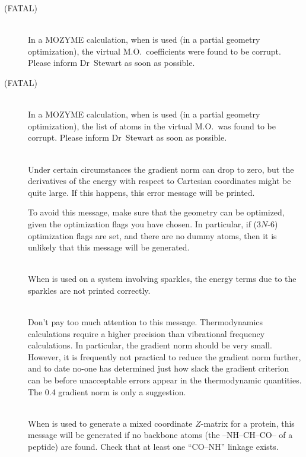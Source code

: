 \begin{description}
\item[ (FATAL)]~\\
In a MOZYME calculation, when  is used (in a partial geometry
optimization), the virtual  M.O.\ coefficients were found to be corrupt.
Please inform Dr~Stewart as soon as possible.

\item[ (FATAL)]~\\
In a MOZYME calculation, when  is used (in a partial geometry
optimization), the list of atoms in the virtual M.O.\  was found to be corrupt.
Please inform Dr~Stewart as soon as possible.

\item[]~\\
Under certain circumstances the gradient norm can drop to zero, but the
derivatives of the energy with respect to Cartesian coordinates might be
quite large.  If this happens, this error message will be printed.

To avoid this message, make sure that the geometry can be optimized, given the
optimization flags you have chosen.  In particular, if (3$N$-6) optimization
flags are set, and there are no dummy atoms, then it is unlikely that this
message will be generated. 

\item[]~\\
When  is used on a system involving sparkles, the energy terms
due to the sparkles are not printed correctly.

\item[]~\\
Don't pay too  much  attention  to  this  message.   Thermodynamics
calculations  require  a  higher  precision  than  vibrational frequency
calculations.  In particular, the gradient norm should  be  very  small.
However,  it  is  frequently  not  practical to reduce the gradient norm
further, and to date no-one has determined just how slack  the  gradient
criterion  can be before unacceptable errors appear in the thermodynamic
quantities.  The 0.4 gradient norm is only a suggestion.

\item[]~\\
When  is used to generate a mixed coordinate $Z$-matrix for a
protein, this message will be generated if no backbone atoms (the --NH--CH--CO--
of a peptide) are found.  Check that at least one ``CO--NH'' linkage exists.
\end{description}
